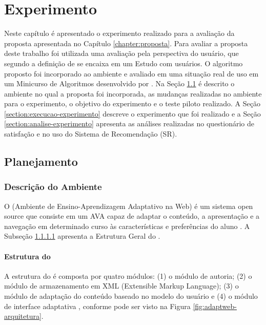 \chapter{Experimento}\label{chapter:experimento}

Neste capítulo é apresentado o experimento realizado para a avaliação da proposta apresentada no Capítulo \ref{chapter:proposta}.
Para avaliar a proposta deste trabalho foi utilizada uma avaliação pela perspectiva do usuário, que segundo a definição de
 se encaixa em um Estudo com usuários. O algoritmo proposto foi incorporado ao ambiente
\adaptweb e avaliado em uma situação real de uso em um Minicurso de Algoritmos desenvolvido por .
Na Seção \ref{section:planejamento-experimento} é descrito o ambiente \adaptweb no qual a proposta foi incorporada,
as mudanças realizadas no ambiente para o experimento, o objetivo do experimento e o teste piloto realizado. A Seção
\ref{section:execucao-experimento} descreve o experimento que foi realizado e a Seção \ref{section:analise-experimento} apresenta
as análises realizadas no questionário de satisfação e no uso do Sistema de Recomendação (SR).

\section{Planejamento}\label{section:planejamento-experimento}

\subsection{Descrição do Ambiente \adaptweb}

O \adaptweb (Ambiente de Ensino-Aprendizagem Adaptativo na Web) é um sistema open source
que consiste em um AVA capaz de adaptar o conteúdo, a apresentação e a navegação em determinado curso às características
e preferências do aluno \cite{gasparini2009adaptweb}. A Subseção \ref{subsection:estrutura-adaptweb} apresenta a Estrutura Geral do
\adaptweb.

\subsubsection{Estrutura do \adaptweb}\label{subsection:estrutura-adaptweb}

A estrutura do \adaptweb é composta por quatro módulos: (1) o módulo de autoria; (2) o
módulo de armazenamento em XML (Extensible Markup Language); (3) o módulo de adaptação do conteúdo baseado no modelo do
usuário e (4) o módulo de interface adaptativa \cite{gasparini2003interface}, conforme pode ser visto na Figura
\ref{fig:adaptweb-arquitetura}.

